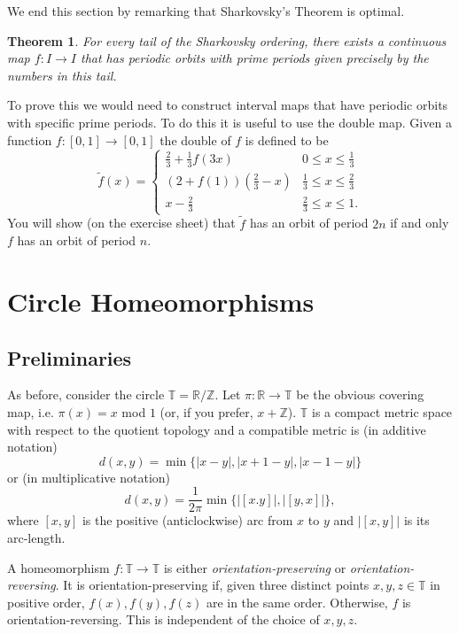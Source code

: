 \documentclass[12pt]{article}
\newtheorem{theorem}{Theorem}[section]
\theoremstyle{definition}
\theoremstyle{remark}
\begin{document}
We end this section by remarking that Sharkovsky's Theorem is optimal.
\begin{theorem}
For every tail of the Sharkovsky ordering, there exists a continuous map $f:I \to I$ that has periodic orbits
with prime periods given precisely by the numbers in this tail.
\end{theorem}

To prove this we would need to construct interval maps that have periodic orbits with specific prime periods. To do this it is useful to use the double map. Given a function $f : [0,1] \to [0,1]$ the double of $f$ is defined to be
\[
\widetilde{f}(x) =\begin{cases}
       \frac{2}{3} + \frac{1}{3}f(3x) &0 \le x \le \frac{1}{3}\\
       (2+f(1))\left(\frac{2}{3} -x\right) &\frac{1}{3} \le x \le \frac{2}{3}\\
       x - \frac{2}{3} &\frac{2}{3} \le x \le 1.
     \end{cases}
\]
You will show (on the exercise sheet) that $\widetilde{f}$ has an orbit of period $2n$ if and only $f$ has an orbit of period $n$.



\newpage 

\section{Circle Homeomorphisms}

\subsection{Preliminaries}
As before, consider the circle $\mathbb T= \mathbb R/\mathbb Z$.
Let $\pi : \mathbb R \to \mathbb T$ be the obvious covering map, i.e.
$\pi(x) = x$ mod $1$ (or, if you prefer, $x+ \mathbb Z$).
$\mathbb T$ is a compact metric space with respect to the quotient topology and a
compatible metric is (in additive notation)
\[
d(x,y) = \min\{|x-y|, |x+1-y|, |x-1-y|\}
\]
or (in multiplicative notation)
\[
d(x,y) = \frac{1}{2\pi} \min\{|[x.y]|,|[y,x]|\},
\]
where $[x,y]$ is the positive (anticlockwise) arc from $x$ to $y$ and $|[x,y]|$ is its arc-length.

A homeomorphism $f : \mathbb T \to \mathbb T$ is either {\it orientation-preserving} or {\it orientation-reversing}.
It is orientation-preserving if, given three distinct points $x,y,z \in \mathbb T$ in positive order, $f(x),f(y),f(z)$ are in the same order. Otherwise, $f$ is orientation-reversing. This is independent of the choice of $x,y,z$. 
\end{document}
